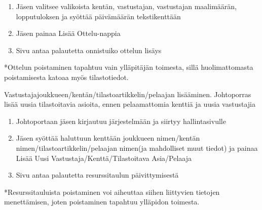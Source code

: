 \documentclass[12pt]{article} %
\begin{document}
\begin{enumerate}
\begin{item}
\begin{enumerate}
		\item Jäsen valitsee valikoista kentän, vastustajan, vastustajan maalimäärän, lopputuloksen ja syöttää päivämäärän tekstikenttään
		\item Jäsen painaa Lisää Ottelu-nappia
		\item Sivu antaa palautetta onnistuiko ottelun lisäys
	\end{enumerate}
*Ottelun poistaminen tapahtuu vain ylläpitäjän toimesta, sillä huolimattomasta poistamisesta katoaa myös tilastotiedot.
\end{item}
\begin{item}
Vastustajajoukkueen/kentän/tilastoartikkelin/pelaajan lisääminen. Johtoporras lisää uusia tilastoitavia asioita, ennen pelaamattomia kenttiä ja uusia vastustajia
	\begin{enumerate}
		\item Johtoportaan jäsen kirjautuu järjestelmään ja siirtyy hallintasivulle
		\item Jäsen syöttää haluttuun kenttään joukkueen nimen/kentän nimen/tilastoartikkelin/pelaajan nimen(ja mahdolliset muut tiedot) ja painaa Lisää Uusi Vastustaja/Kenttä/Tilastoitava Asia/Pelaaja
		\item Sivu antaa palautetta resurssitaulun päivittymisestä
	\end{enumerate}
*Resurssitauluista poistaminen voi aiheuttaa siihen liittyvien tietojen menettämisen, joten poistaminen tapahtuu ylläpidon toimesta.
\end{item}
\end{enumerate}
\end{document}
